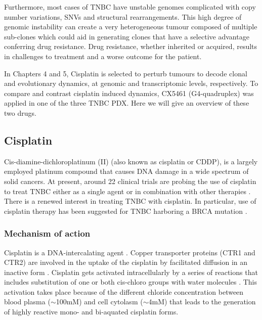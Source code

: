 Furthermore, most cases of TNBC have unstable genomes complicated with copy number variations, SNVs and structural rearrangements. This high degree of genomic instability can create a very heterogeneous tumour composed of multiple sub-clones which could aid in generating clones that have a selective advantage conferring drug resistance. Drug resistance, whether inherited or acquired, results in challenges to treatment and a worse outcome for the patient.

In Chapters 4 and 5, Cisplatin is selected to perturb tumours to decode clonal and evolutionary dynamics, at genomic and transcriptomic levels, respectively. To compare and contrast cisplatin induced dynamics, CX5461 (G4-quadruplex) was applied in one of the three TNBC PDX. Here we will give an overview of these two drugs.


\subsection{Cisplatin}
Cis-diamine-dichloroplatinum (II) (also known as cisplatin or CDDP),  is a largely employed platinum compound that causes DNA damage in  a wide spectrum of solid cancers.  At present, around 22 clinical trials are probing the use of cisplatin to treat TNBC either as a single agent or in combination with other therapies \cite{us2017clinicaltrials}.
There is a renewed interest in treating TNBC with cisplatin.
In particular, use of cisplatin therapy has been suggested for TNBC harboring a BRCA mutation \cite{caparica2019treat,petrelli2016platinum}. 

\subsubsection{Mechanism of action}
Cisplatin is a DNA-intercalating agent \cite{dasari2014cisplatin, kartalou2001mechanisms}. Copper transporter proteins (CTR1 and CTR2) are involved in the uptake of the cisplatin by facilitated diffusion in an inactive form \cite{arnesano2018platinum,ishida2002uptake}. Cisplatin gets activated intracellularly by a series of reactions that includes substitution of one or both cis-chloro groups with water molecules \cite{el1999reactions}. This activation takes place because of the different chloride concentration between blood plasma ($\sim${100mM}) and cell cytolasm ($\sim${4mM}) that leads to the generation of highly reactive mono- and bi-aquated cisplatin forms.


